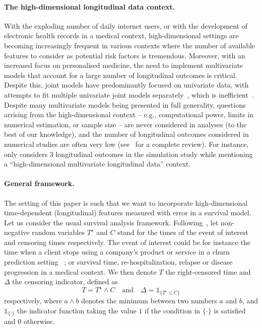 \documentclass[11pt]{article}
\newcommand{\ind}[1]{\mathds{1}_{#1}}
\begin{document}
\paragraph{The high-dimensional longitudinal data context.}
With the exploding number of daily internet users, or with the development of electronic health records in a medical context, high-dimensional settings are becoming increasingly frequent in various contexts where the number of available features to consider as potential risk factors is tremendous.
Moreover, with an increased focus on personalised medicine, the need to implement multivariate models that account for a large number of longitudinal outcomes is critical. Despite this, joint models have predominantly focused on univariate data, with attempts to fit multiple univariate joint models separately~\citep{wang2012joint}, which is inefficient~\citep{lin2002maximum}. 
Despite many multivariate models being presented in full generality, questions arrising from the high-dimensional context -- e.g., computational power, limits in numerical estimation, or sample size -- are never considered in analyses (to the best of our knowledge), and the number of longitudinal outcomes considered in numerical studies are often very low (see~\citet{hickey2016joint} for a complete review). For instance,~\citet{jaffa2014joint} only considers 3 longitudinal outcomes in the simulation study while mentioning a ``high-dimensional multivariate longitudinal data'' context.


\paragraph{General framework.}

The setting of this paper is such that we want to incorporate high-dimensional time-dependent (longitudinal) features measured with error in a survival model. Let us consider the usual survival analysis framework.
Following~\citet{andersen2012statistical}, let non-negative random variables $T^\star$ and $C$ stand for the times of the event of interest and censoring times respectively. The event of interest could be for instance the time when a client stops using a company's product or service in a churn prediction setting~ ; or survival time, re-hospitalization, relapse or disease progression in a medical context.
We then denote $T$ the right-censored time and $\Delta$ the censoring indicator, defined as 
\begin{equation*}
T = T^\star \wedge C \quad \text{and} \quad \Delta = \ind{\{T^\star \leq C\}}
\end{equation*}
respectively, where $a \wedge b$ denotes the minimum between two numbers $a$ and $b$, and $\ind{\{\cdot\}}$ the indicator function taking the value $1$ if the condition in $\{\cdot\}$ is satisfied and $0$ otherwise.
\end{document}
